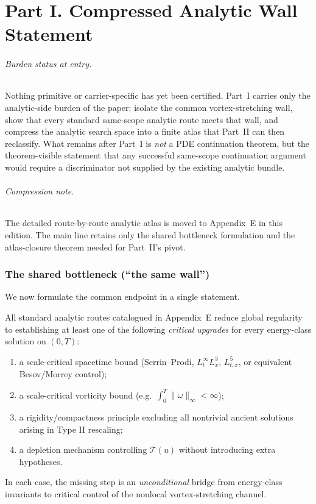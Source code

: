 \part*{Part I. Compressed Analytic Wall Statement}

\paragraph{Burden status at entry.}
Nothing primitive or carrier-specific has yet been certified. Part~I carries only the analytic-side burden of the paper: isolate the common vortex-stretching wall, show that every standard same-scope analytic route meets that wall, and compress the analytic search space into a finite atlas that Part~II can then reclassify. What remains after Part~I is \emph{not} a PDE continuation theorem, but the theorem-visible statement that any successful same-scope continuation argument would require a discriminator not supplied by the existing analytic bundle.

\paragraph{Compression note.}
The detailed route-by-route analytic atlas is moved to Appendix~E in this edition.
The main line retains only the shared bottleneck formulation and the atlas-closure theorem needed for
Part~II's pivot.

\section{The shared bottleneck (``the same wall'')}
We now formulate the common endpoint in a single statement.

\begin{proposition}\label{prop:common-bottleneck}
All standard analytic routes catalogued in Appendix~E reduce global regularity to establishing at least one of the following
\emph{critical upgrades} for every energy-class solution on $(0,T)$:
\begin{enumerate}[label=(\alph*)]
\item a scale-critical spacetime bound (Serrin--Prodi, $L^\infty_t L^3_x$, $L^5_{t,x}$, or equivalent Besov/Morrey control);
\item a scale-critical vorticity bound (e.g.\ $\int_0^T \|\omega\|_\infty<\infty$);
\item a rigidity/compactness principle excluding all nontrivial ancient solutions arising in Type II rescaling;
\item a depletion mechanism controlling $\mathcal T(u)$ without introducing extra hypotheses.
\end{enumerate}
In each case, the missing step is an \emph{unconditional} bridge from energy-class invariants to
critical control of the nonlocal vortex-stretching channel.
\end{proposition}

